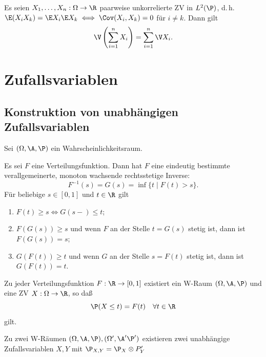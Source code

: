 \documentclass[11pt, a4paper]{article}
\begin{document}
\begin{theorem}[Bienaymé] \Theorem
    Es seien $X_1, \dots, X_n: \Omega \to \R$ paarweise unkorrelierte ZV in $L^2(\P)$, d.\,h. $\E(X_i X_k) = \E X_i \E X_k \iff \Cov(X_i, X_k) = 0$ für $i \ne k$. Dann gilt
    $$\V\left(\sum_{i=1}^n X_i\right) = \sum_{i=1}^n \V X_i.$$
\end{theorem}


\newpage

\section{Zufallsvariablen}
\subsection{Konstruktion von unabhängigen Zufallsvariablen}


Sei $(\Omega, \A, \P)$ ein Wahrscheinlichkeitsraum. 

\begin{lemma}
    Es sei $F$ eine Verteilungsfunktion. Dann hat $F$ eine eindeutig bestimmte verallgemeinerte, monoton wachsende rechtsstetige Inverse:
    $$F^{-1}(s) = G(s) = \inf\{t \mid F(t) > s\}.$$
    Für beliebige $s \in [0,1]$ und $t \in \R$ gilt
    \begin{enumerate}[label=\alph*)]
        \item $F(t) \ge s \iff G(s-) \le t$;
        \item $F(G(s)) \ge s$ und wenn $F$ an der Stelle $t = G(s)$ stetig ist, dann ist $F(G(s)) = s$;
        \item $G(F(t)) \ge t$ und wenn $G$ an der Stelle $s = F(t)$ stetig ist, dann ist $G(F(t)) = t$.
    \end{enumerate}
\end{lemma}


\begin{corollary}
    Zu jeder Verteilungsfunktion $F: \R \to [0,1]$ existiert ein W-Raum $(\Omega, \A, \P)$ und eine ZV $X: \Omega \to \R$, so daß
    $$\P(X \le t) = F(t) \quad \forall t \in \R$$
    gilt.
\end{corollary}

\begin{corollary}
    Zu zwei W-Räumen $(\Omega, \A, \P), (\Omega', \A' \P')$ existieren zwei unabhängige Zufallsvariablen $X, Y$ mit $\P_{X,Y} = \P_X \otimes P'_Y$
\end{corollary}
\end{document}
